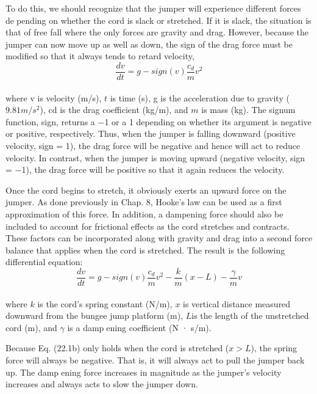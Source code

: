 To do this, we should recognize that the jumper will experience different forces depending on whether the cord is slack or stretched. If it is slack, the situation is that of free
fall where the only forces are gravity and drag. However, because the jumper can now
move up as well as down, the sign of the drag force must be modified so that it always tends
to retard velocity,
\begin{equation}
\tag{22.1a}
\dfrac{dv}{dt} = g - sign(v)\dfrac{c_{d}}{m}v^2
\end{equation}\\
where v is velocity (m/s), $t$ is time (s), g is the acceleration due to gravity ($9.81 m/s^2$), cd is
the drag coefficient (kg/m), and $m$ is mass (kg). The signum function\footnotemark, sign, returns a −1 or
a 1 depending on whether its argument is negative or positive, respectively. Thus, when the
jumper is falling downward (positive velocity, sign = 1), the drag force will be negative
and hence will act to reduce velocity. In contrast, when the jumper is moving upward
(negative velocity, sign = −1), the drag force will be positive so that it again reduces the
velocity.


Once the cord begins to stretch, it obviously exerts an upward force on the jumper. As
done previously in Chap. 8, Hooke’s law can be used as a first approximation of this force.
In addition, a dampening force should also be included to account for frictional effects as
the cord stretches and contracts. These factors can be incorporated along with gravity and
drag into a second force balance that applies when the cord is stretched. The result is the
following differential equation:
\begin{equation}
\tag{22.1b}
\dfrac{dv}{dt} = g - sign(v) \dfrac{c_{d}}{m} v^2 - \dfrac{k}{m} (x-L) - \dfrac{\gamma}{m}v
\end{equation}\\
where $k$ is the cord’s spring constant (N/m), $x$ is vertical distance measured downward from
the bungee jump platform (m), $L $is the length of the unstretched cord (m), and $\gamma$ is a dampening coefficient (N · s/m).

Because Eq. (22.1b) only holds when the cord is stretched ($x > L$), the spring force
will always be negative. That is, it will always act to pull the jumper back up. The dampening force increases in magnitude as the jumper’s velocity increases and always acts to
slow the jumper down.

